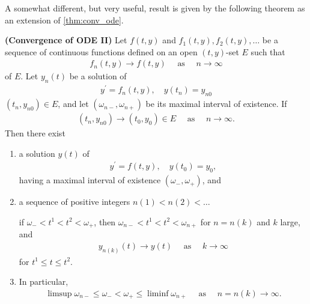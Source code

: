 \documentclass{article}
\newcommand{\bfs}[1]{\textbf{({#1}) }}
\begin{document}
A somewhat different, but very useful, result is given by the following theorem as an extension of \cref{thm:conv_ode}.

\begin{thma}\label{thm:nncad}\bfs{Convergence of ODE II}
Let $f(t, y)$ and $f_{1}(t, y), f_{2}(t, y), \ldots$ be a sequence of continuous functions defined on an open $(t, y)$-set $E$ such that
\begin{align}
f_{n}(t, y) \rightarrow f(t, y) \quad \text { as } \quad n \rightarrow \infty\label{eq:3.4}
\end{align}
 of $E$. Let $y_{n}(t)$ be a solution of
\begin{align}
y^{\prime}=f_{n}(t, y), \quad y\left(t_{n}\right)=y_{n 0} \label{eq:3.5}
\end{align}
$\left(t_{n}, y_{n 0}\right) \in E$, and let $\left(\omega_{n-}, \omega_{n+}\right)$ be its maximal interval of existence. If
\begin{align}
\left(t_{n}, y_{n 0}\right) \rightarrow\left(t_{0}, y_{0}\right) \in E \quad \text { as } \quad n \rightarrow \infty. \label{eq:3.6}
\end{align}
Then there exist 
\begin{enumerate}[1)]
    \item a solution $y(t)$ of
\begin{align}
y^{\prime}=f(t, y), \quad y\left(t_{0}\right)=y_{0}, \label{eq:3.7}
\end{align}
having a maximal interval of existence $\left(\omega_{-}, \omega_{+}\right)$, and
\item a sequence of positive integers $n(1)<n(2)<\ldots$ 

if $\omega_{-}<t^{1}<t^{2}<\omega_{+}$, then $\omega_{n-}<t^{1}<t^{2}<\omega_{n+}$ for $n=n(k)$ and $k$ large, and
\begin{align}
y_{n(k)}(t) \rightarrow y(t) \quad \text { as } \quad k \rightarrow \infty \label{eq:3.8}
\end{align}
 for $t^{1} \le t \le t^{2}$. 
\item In particular,
\begin{align}
    \limsup \omega_{n-} \le \omega_{-}<\omega_{+} \le \liminf \omega_{n+} \quad\text{ as }\quad n=n(k) \rightarrow \infty. \label{eq:3.9}
\end{align}
\end{enumerate} 
\end{thma} 
\end{document}
